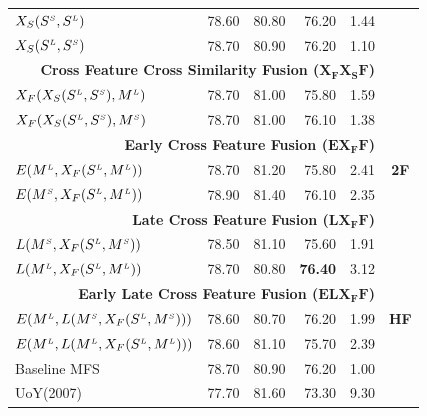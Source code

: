 \begin{table}[htp!]
\begin{tabular}{@{}lrrrrc@{}}
 
	   $X_S(S^{\scriptscriptstyle S}, S^{\scriptscriptstyle L})$		& 78.60 & 80.80 & 76.20  & 1.44\\
	   $X_S(S^{\scriptscriptstyle L}, S^{\scriptscriptstyle S})$		& 78.70 & 80.90	& 76.20 & 1.10\\
	  
 \midrule
                   \multicolumn{5}{r}{\textbf{Cross Feature Cross Similarity Fusion ($\mathbf{X_FX_SF}$)}}  & \multirow{9}{*}{\textbf{2F}}     \\ %
	   
       $X_F(X_S(S^{\scriptscriptstyle L}, S^{\scriptscriptstyle S}), M^{\scriptscriptstyle L})$		& 78.70 & 81.00 & 75.80 & 1.59 \\	   
       $X_F(X_S(S^{\scriptscriptstyle L}, S^{\scriptscriptstyle S}), M^{\scriptscriptstyle S})$		& 78.70 & 81.00 & 76.10 & 1.38\\	   
                   \multicolumn{5}{r}{\textbf{Early Cross Feature Fusion ($\mathbf{EX_FF}$)}}       \\ %
       
       $E(M^{\scriptscriptstyle L}, X_F(S^{\scriptscriptstyle L}, M^{\scriptscriptstyle L}))$		&78.70 & 81.20 & 75.80 & 2.41\\	   
	   $E(M^{\scriptscriptstyle S}, X_F(S^{\scriptscriptstyle L}, M^{\scriptscriptstyle L}))$		& 78.90 & 81.40 & 76.10 & 2.35\\	   
                   \multicolumn{5}{r}{\textbf{Late Cross Feature Fusion ($\mathbf{LX_FF}$)}}       \\ %
	   $L(M^{\scriptscriptstyle S}, X_F(S^{\scriptscriptstyle L}, M^{\scriptscriptstyle S}))$		& 78.50 & 81.10 & 75.60 & 1.91\\	   
	   $L(M^{\scriptscriptstyle L}, X_F(S^{\scriptscriptstyle L}, M^{\scriptscriptstyle L}))$		& 78.70 & 80.80 & \textbf{76.40} & 3.12\\	   
       \midrule
                   \multicolumn{5}{r}{\textbf{Early Late Cross Feature Fusion ($\mathbf{ELX_FF}$)}}     & \multirow{3}{*}{\textbf{HF}}  \\ %
	   $E(M^{\scriptscriptstyle L}, L(M^{\scriptscriptstyle S}, X_F(S^{\scriptscriptstyle L}, M^{\scriptscriptstyle S})))$		& 78.60 & 80.70 & 76.20 & 1.99\\	   
	   $E(M^{\scriptscriptstyle L}, L(M^{\scriptscriptstyle L}, X_F(S^{\scriptscriptstyle L}, M^{\scriptscriptstyle L})))$		& 78.60 & 81.10 & 75.70 & 2.39\\
	   \midrule
	   \midrule
	   

	   Baseline MFS		& 78.70 & 80.90 & 76.20 & 1.00\\ 	   	 	    
	   UoY(2007)& 77.70 & 81.60 & 73.30 & 9.30\\ 	 		   
       \bottomrule
\end{tabular}
\end{table}


